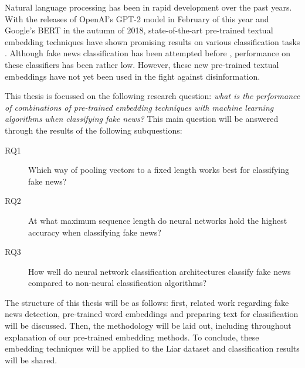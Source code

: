 Natural language processing has been in rapid development over the past years. 
With the releases of OpenAI's GPT-2 model in February of this year and Google's BERT in the autumn of 2018, state-of-the-art pre-trained textual embedding techniques have shown promising results on various classification tasks \cite{radford2019}\cite{devlin2018}. 
Although fake news classification has been attempted before \cite{wang2018}\cite{khurana2017}, performance on these classifiers has been rather low. 
However, these new pre-trained textual embeddings have not yet been used in the fight against disinformation. 

This thesis is focussed on the following research question: \textit{what is the performance of combinations of pre-trained embedding techniques with machine learning algorithms when classifying fake news?}
This main question will be answered through the results of the following subquestions:

\begin{description}
\item[RQ1] Which way of pooling vectors to a fixed length works best for classifying fake news?
\item[RQ2] At what maximum sequence length do neural networks hold the highest accuracy when classifying fake news?
\item[RQ3] How well do neural network classification architectures classify fake news compared to non-neural classification algorithms?
\end{description}

The structure of this thesis will be as follows: first, related work regarding fake news detection, pre-trained word embeddings and preparing text for classification will be discussed.
Then, the methodology will be laid out, including throughout explanation of our pre-trained embedding methods. 
To conclude, these embedding techniques will be applied to the Liar dataset and classification results will be shared.